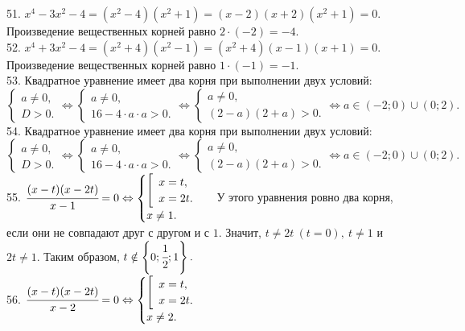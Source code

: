 51. $x^4-3x^2-4=(x^2-4)(x^2+1)=(x-2)(x+2)(x^2+1)=0.$ Произведение вещественных корней равно $2\cdot(-2)=-4.$\\
52. $x^4+3x^2-4=(x^2+4)(x^2-1)=(x^2+4)(x-1)(x+1)=0.$ Произведение вещественных корней равно $1\cdot(-1)=-1.$\\
53. Квадратное уравнение имеет два корня при выполнении двух условий:\\ $\begin{cases}a\neq0,\\ D>0.\end{cases}\Leftrightarrow
\begin{cases}a\neq0,\\ 16-4\cdot a \cdot a>0.\end{cases}\Leftrightarrow
\begin{cases}a\neq0,\\ (2-a)(2+a)>0.\end{cases}\Leftrightarrow a\in(-2;0)\cup(0;2).$\\
54. Квадратное уравнение имеет два корня при выполнении двух условий:\\ $\begin{cases}a\neq0,\\ D>0.\end{cases}\Leftrightarrow
\begin{cases}a\neq0,\\ 16-4\cdot a \cdot a>0.\end{cases}\Leftrightarrow
\begin{cases}a\neq0,\\ (2-a)(2+a)>0.\end{cases}\Leftrightarrow a\in(-2;0)\cup(0;2).$\\
55. $\cfrac{(x-t)(x-2t)}{x-1}=0\Leftrightarrow\begin{cases}\left[\begin{array}{l}x=t,\\ x=2t.\end{array}\right.\\x\neq1.\end{cases}$
У этого уравнения ровно два корня, если они не совпадают друг с другом и с $1.$ Значит, $t\neq2t\ (t=0),\ t\neq1$ и $2t\neq1.$ Таким образом, $t\notin\left\{0; \cfrac{1}{2}; 1\right\}.$\\
56. $\cfrac{(x-t)(x-2t)}{x-2}=0\Leftrightarrow\begin{cases}\left[\begin{array}{l}x=t,\\ x=2t.\end{array}\right.\\x\neq2.\end{cases}$
